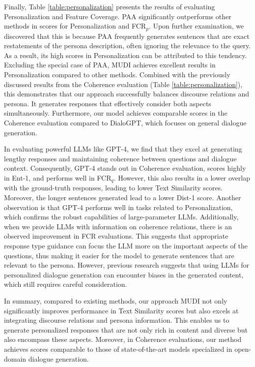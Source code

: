 Finally, Table \ref{table:personalization} presents the results of evaluating Personalization and Feature Coverage. PAA significantly outperforms other methods in scores for Personalization and FCR$_p$. Upon further examination, we discovered that this is because PAA frequently generates sentences that are exact restatements of the persona description, often ignoring the relevance to the query. As a result, its high scores in Personalization can be attributed to this tendency. Excluding the special case of PAA, MUDI achieves excellent results in Personalization compared to other methods. Combined with the previously discussed results from the Coherence evaluation (Table \ref{table:personalization}), this demonstrates that our approach successfully balances discourse relations and persona. It generates responses that effectively consider both aspects simultaneously. Furthermore, our model achieves comparable scores in the Coherence evaluation compared to DialoGPT, which focuses on general dialogue generation.

In evaluating powerful LLMs like GPT-4, we find that they excel at generating lengthy responses and maintaining coherence between questions and dialogue context. Consequently, GPT-4 stands out in Coherence evaluation, scores highly in Ent-1, and performs well in FCR$_q$. However, this also results in a lower overlap with the ground-truth responses, leading to lower Text Similarity scores. Moreover, the longer sentences generated lead to a lower Dist-1 score. Another observation is that GPT-4 performs well in tasks related to Personalization, which confirms the robust capabilities of large-parameter LLMs. Additionally, when we provide LLMs with information on coherence relations, there is an observed improvement in FCR evaluations. This suggests that appropriate response type guidance can focus the LLM more on the important aspects of the questions, thus making it easier for the model to generate sentences that are relevant to the persona. However, previous research \cite{deshpande-etal-2023-toxicity} suggests that using LLMs for personalized dialogue generation can encounter biases in the generated content, which still requires careful consideration.

In summary, compared to existing methods, our approach MUDI not only significantly improves performance in Text Similarity scores but also excels at integrating discourse relations and persona information. This enables us to generate personalized responses that are not only rich in content and diverse but also encompass these aspects. Moreover, in Coherence evaluations, our method achieves scores comparable to those of state-of-the-art models specialized in open-domain dialogue generation.

